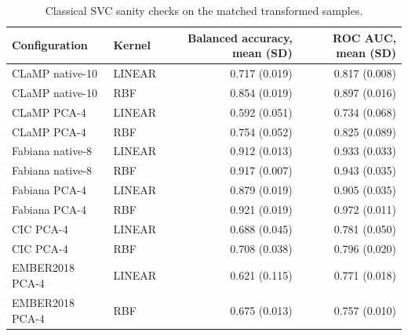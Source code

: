 \begin{table}[tbp]
\caption{Classical SVC sanity checks on the matched transformed samples.}
\label{tab:classical-baselines}
\begin{tabular}{llrr}
\toprule
Configuration & Kernel & Balanced accuracy, mean (SD) & ROC AUC, mean (SD) \\
\midrule
CLaMP native-10 & LINEAR & 0.717 (0.019) & 0.817 (0.008) \\
CLaMP native-10 & RBF & 0.854 (0.019) & 0.897 (0.016) \\
CLaMP PCA-4 & LINEAR & 0.592 (0.051) & 0.734 (0.068) \\
CLaMP PCA-4 & RBF & 0.754 (0.052) & 0.825 (0.089) \\
Fabiana native-8 & LINEAR & 0.912 (0.013) & 0.933 (0.033) \\
Fabiana native-8 & RBF & 0.917 (0.007) & 0.943 (0.035) \\
Fabiana PCA-4 & LINEAR & 0.879 (0.019) & 0.905 (0.035) \\
Fabiana PCA-4 & RBF & 0.921 (0.019) & 0.972 (0.011) \\
CIC PCA-4 & LINEAR & 0.688 (0.045) & 0.781 (0.050) \\
CIC PCA-4 & RBF & 0.708 (0.038) & 0.796 (0.020) \\
EMBER2018 PCA-4 & LINEAR & 0.621 (0.115) & 0.771 (0.018) \\
EMBER2018 PCA-4 & RBF & 0.675 (0.013) & 0.757 (0.010) \\
\bottomrule
\end{tabular}
\end{table}
